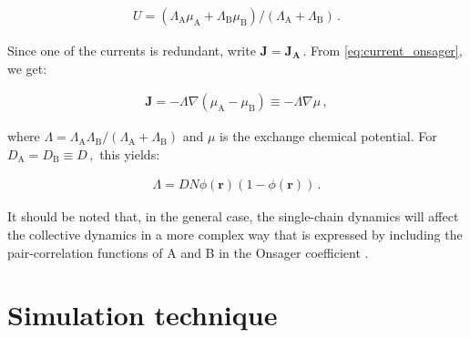 \documentclass[bachelor,       %
               twoside,        %
               BCOR10mm,       %
                ngerman,english  %
               ]{GAUBM}
\begin{document}
\begin{align}
  U=(\Lambda_\mathrm A\mu_\mathrm A+\Lambda_\mathrm B\mu_\mathrm B)/(\Lambda_\mathrm A+\Lambda_\mathrm B)\,.
\end{align}

Since one of the currents is redundant, write $\mathbf{J}=\mathbf{J_A}\,.$ From \eqref{eq:current_onsager}, we get:

\begin{align}
  \mathbf J=-\Lambda\nabla(\mu_\mathrm A - \mu_\mathrm B)\equiv -\Lambda\nabla\mu\,,
\end{align}

where $\Lambda=\Lambda_\mathrm A\Lambda_\mathrm B/(\Lambda_\mathrm A+\Lambda_\mathrm B)$ and $\mu$ is the exchange chemical potential. For $D_\mathrm A=D_\mathrm B\equiv D\,,$ this yields:

\begin{align}
  \Lambda=DN\phi(\mathbf{r})(1-\phi(\mathbf{r}))\,.
  \label{eq:onsager}
\end{align}


It should be noted that, in the general case, the single-chain dynamics will affect the collective dynamics in a more complex way that is expressed by including the pair-correlation functions of A and B in the Onsager coefficient \cite{Reister02}. 

\chapter{Simulation technique}
\end{document}
